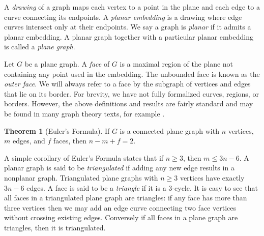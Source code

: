 \documentclass[letterpaper, 12pt]{amsart}
\theoremstyle{definition}
\theoremstyle{definition}
\theoremstyle{thm}
\newtheorem{theorem}{Theorem}[section]
\theoremstyle{definition}
\begin{document}
A \textit{drawing} of a graph maps each vertex to a point in the
plane and each edge to a curve connecting its endpoints. A \textit{planar
embedding} is a drawing where edge curves intersect only at their
endpoints. We say a graph is \textit{planar} if it admits a planar embedding. A
planar graph together with a particular planar embedding is called a
\textit{plane graph}.

Let $G$ be a plane graph. A \textit{face} of $G$ is a maximal region
of the plane not containing any point used in the embedding. The unbounded face
is known as the \textit{outer face}. We will always refer to a face by the
subgraph of vertices and edges that lie on its border. For brevity, we have
not fully formalized curves, regions, or borders. However, the
above definitions and results are fairly standard and may be found in many graph
theory texts, for example \cite{west}.

\begin{theorem}[Euler's Formula]
If $G$ is a connected plane graph with $n$ vertices, $m$ edges, and $f$ faces,
then $n-m+f=2$.
\end{theorem}

A simple corollary of Euler's Formula states that if $n\ge 3$, then $m\le 3n-6$.
A planar graph is said to be \textit{triangulated} if adding any new edge
results in a nonplanar graph. Triangulated plane graphs with $n\ge 3$ vertices
have exactly $3n-6$ edges. A face is said to be a \textit{triangle} if it is a
$3$-cycle. It is easy to see that all faces in a triangulated
plane graph are triangles: if any face has more than three vertices then we may
add an edge curve connecting two face vertices without crossing existing edges.
Conversely if all faces in a plane graph are triangles, then it is triangulated.

\begin{comment}
\begin{figure}
\begin{tikzpicture}
	\node (a) at (0.75cm,0.75cm) {};
	\node (b) at (0.75cm,-0.75cm) {};
	\node (c) at (-0.75cm,-0.75cm) {};
	\node (d) at (-0.75cm,0.75cm) {};
	\node [draw=none, fill=none] (1) at (0cm,-1cm) {};
	\node [draw=none, fill=none] (2) at (0cm,1cm) {};
	\draw (a) -- (b) -- (c) -- (d) -- (a);
	\draw (a) -- (c); \draw (b) -- (d);
\end{tikzpicture}
$\qquad$
\begin{tikzpicture}
	\node (a) at (0cm,0.75cm) {};
	\node (b) at (0.866cm,-0.75cm) {};
	\node (c) at (-0.866cm,-0.75cm) {};
	\node (d) at (0cm, -0.18cm) {};
	\node [draw=none, fill=none] (1) at (0cm,-1cm) {};
	\node [draw=none, fill=none] (2) at (0cm,1cm) {};
	\draw (a) -- (b) -- (c) -- (d) -- (a);
	\draw (a) -- (c); \draw (b) -- (d);
\end{tikzpicture}

\caption{A nonplanar drawing and a planar embedding of $K_4$.}
\end{figure}
\end{comment}
\end{document}
